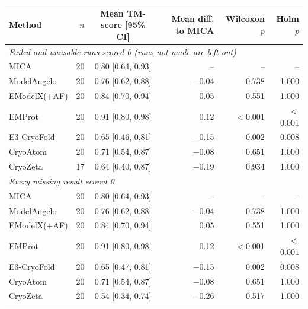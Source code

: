 \begin{tabular}{lrcrrr}
\toprule
Method & $n$ & Mean TM-score [95\% CI] & Mean diff. to MICA & Wilcoxon $p$ & Holm $p$ \\
\midrule
\multicolumn{6}{l}{\emph{Failed and unusable runs scored 0 (runs not made are left out)}} \\
MICA & 20 & 0.80 [0.64, 0.93] & -- & -- & -- \\
ModelAngelo & 20 & 0.76 [0.62, 0.88] & $-$0.04 & 0.738 & 1.000 \\
EModelX(+AF) & 20 & 0.84 [0.70, 0.94] & 0.05 & 0.551 & 1.000 \\
EMProt & 20 & 0.91 [0.80, 0.98] & 0.12 & $<$0.001 & $<$0.001 \\
E3-CryoFold & 20 & 0.65 [0.46, 0.81] & $-$0.15 & 0.002 & 0.008 \\
CryoAtom & 20 & 0.71 [0.54, 0.87] & $-$0.08 & 0.651 & 1.000 \\
CryoZeta & 17 & 0.64 [0.40, 0.87] & $-$0.19 & 0.934 & 1.000 \\
\midrule
\multicolumn{6}{l}{\emph{Every missing result scored 0}} \\
MICA & 20 & 0.80 [0.64, 0.93] & -- & -- & -- \\
ModelAngelo & 20 & 0.76 [0.62, 0.88] & $-$0.04 & 0.738 & 1.000 \\
EModelX(+AF) & 20 & 0.84 [0.70, 0.94] & 0.05 & 0.551 & 1.000 \\
EMProt & 20 & 0.91 [0.80, 0.98] & 0.12 & $<$0.001 & $<$0.001 \\
E3-CryoFold & 20 & 0.65 [0.47, 0.81] & $-$0.15 & 0.002 & 0.008 \\
CryoAtom & 20 & 0.71 [0.54, 0.87] & $-$0.08 & 0.651 & 1.000 \\
CryoZeta & 20 & 0.54 [0.34, 0.74] & $-$0.26 & 0.517 & 1.000 \\
\bottomrule
\end{tabular}
